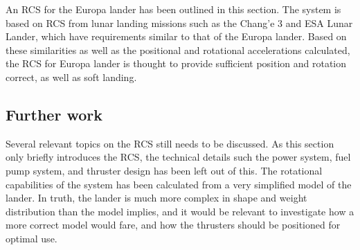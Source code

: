 An RCS for the Europa lander has been outlined in this section. The system is based on RCS from lunar landing missions such as the Chang'e 3 and ESA Lunar Lander, which have requirements similar to that of the Europa lander. Based on these similarities as well as the positional and rotational accelerations calculated, the RCS for Europa lander is thought to provide sufficient position and rotation correct, as well as soft landing. 

\subsection{Further work}

Several relevant topics on the RCS still needs to be discussed. As this section only briefly introduces the RCS, the technical details such the power system, fuel pump system, and thruster design has been left out of this. The rotational capabilities of the system has been calculated from a very simplified model of the lander. In truth, the lander is much more complex in shape and weight distribution than the model implies, and it would be relevant to investigate how a more correct model would fare, and how the thrusters should be positioned for optimal use.
